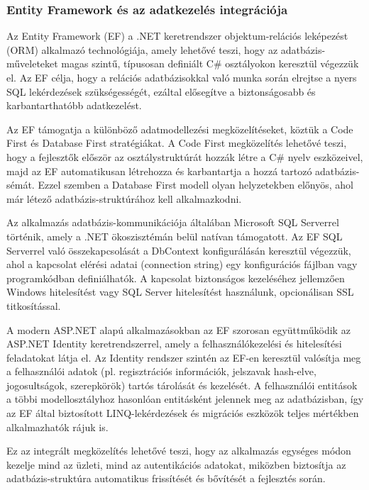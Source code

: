 \subsubsection{Entity Framework és az adatkezelés integrációja}

\indent Az Entity Framework (EF) a .NET keretrendszer objektum-relációs leképezést (ORM) alkalmazó technológiája, amely lehetővé teszi, hogy az adatbázis-műveleteket magas szintű, típusosan definiált C\# osztályokon keresztül végezzük el. Az EF célja, hogy a relációs adatbázisokkal való munka során elrejtse a nyers SQL lekérdezések szükségességét, ezáltal elősegítve a biztonságosabb és karbantarthatóbb adatkezelést.

Az EF támogatja a különböző adatmodellezési megközelítéseket, köztük a Code First és Database First stratégiákat. A Code First megközelítés lehetővé teszi, hogy a fejlesztők először az osztálystruktúrát hozzák létre a C\# nyelv eszközeivel, majd az EF automatikusan létrehozza és karbantartja a hozzá tartozó adatbázis-sémát. Ezzel szemben a Database First modell olyan helyzetekben előnyös, ahol már létező adatbázis-struktúrához kell alkalmazkodni.

Az alkalmazás adatbázis-kommunikációja általában Microsoft SQL Serverrel történik, amely a .NET ökoszisztémán belül natívan támogatott. Az EF SQL Serverrel való összekapcsolását a DbContext konfigurálásán keresztül végezzük, ahol a kapcsolat elérési adatai (connection string) egy konfigurációs fájlban vagy programkódban definiálhatók. A kapcsolat biztonságos kezeléséhez jellemzően Windows hitelesítést vagy SQL Server hitelesítést használunk, opcionálisan SSL titkosítással.

A modern ASP.NET alapú alkalmazásokban az EF szorosan együttműködik az ASP.NET Identity keretrendszerrel, amely a felhasználókezelési és hitelesítési feladatokat látja el. Az Identity rendszer szintén az EF-en keresztül valósítja meg a felhasználói adatok (pl. regisztrációs információk, jelszavak hash-elve, jogosultságok, szerepkörök) tartós tárolását és kezelését. A felhasználói entitások a többi modellosztályhoz hasonlóan entitásként jelennek meg az adatbázisban, így az EF által biztosított LINQ-lekérdezések és migrációs eszközök teljes mértékben alkalmazhatók rájuk is.

Ez az integrált megközelítés lehetővé teszi, hogy az alkalmazás egységes módon kezelje mind az üzleti, mind az autentikációs adatokat, miközben biztosítja az adatbázis-struktúra automatikus frissítését és bővítését a fejlesztés során.

